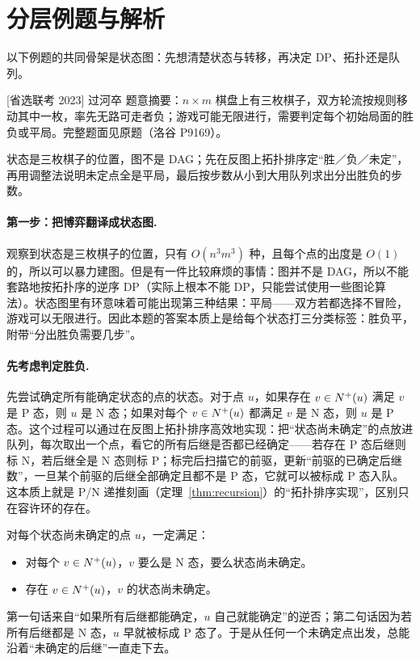 \section{分层例题与解析}

以下例题的共同骨架是状态图：先想清楚状态与转移，再决定 DP、拓扑还是队列。

\begin{problem}{[省选联考 2023] 过河卒}
题意摘要：$n\times m$ 棋盘上有三枚棋子，双方轮流按规则移动其中一枚，率先无路可走者负；游戏可能无限进行，需要判定每个初始局面的胜负或平局。完整题面见原题（洛谷 P9169）。
\end{problem}

\hint 状态是三枚棋子的位置，图不是 DAG；先在反图上拓扑排序定“胜／负／未定”，再用调整法说明未定点全是平局，最后按步数从小到大用队列求出分出胜负的步数。

\sol \paragraph{第一步：把博弈翻译成状态图.} 观察到状态是三枚棋子的位置，只有 $O(n^3m^3)$ 种，且每个点的出度是 $O(1)$ 的，所以可以暴力建图。但是有一件比较麻烦的事情：图并不是 DAG，所以不能套路地按拓扑序的逆序 DP（实际上根本不能 DP，只能尝试使用一些图论算法）。状态图里有环意味着可能出现第三种结果：平局——双方若都选择不冒险，游戏可以无限进行。因此本题的答案本质上是给每个状态打三分类标签：胜负平，附带“分出胜负需要几步”。

\paragraph{先考虑判定胜负.} 先尝试确定所有能确定状态的点的状态。对于点 $u$，如果存在 $v\in N^+(u)$ 满足 $v$ 是 P 态，则 $u$ 是 N 态；如果对每个 $v\in N^+(u)$ 都满足 $v$ 是 N 态，则 $u$ 是 P 态。这个过程可以通过在反图上拓扑排序高效地实现：把“状态尚未确定”的点放进队列，每次取出一个点，看它的所有后继是否都已经确定——若存在 P 态后继则标 N，若后继全是 N 态则标 P；标完后扫描它的前驱，更新“前驱的已确定后继数”，一旦某个前驱的后继全部确定且都不是 P 态，它就可以被标成 P 态入队。这本质上就是 P/N 递推刻画（定理~\ref{thm:recursion}）的“拓扑排序实现”，区别只在容许环的存在。

对每个状态尚未确定的点 $u$，一定满足：
\begin{itemize}
\item 对每个 $v\in N^+(u)$，$v$ 要么是 N 态，要么状态尚未确定。
\item 存在 $v\in N^+(u)$，$v$ 的状态尚未确定。
\end{itemize}
第一句话来自“如果所有后继都能确定，$u$ 自己就能确定”的逆否；第二句话因为若所有后继都是 N 态，$u$ 早就被标成 P 态了。于是从任何一个未确定点出发，总能沿着“未确定的后继”一直走下去。

